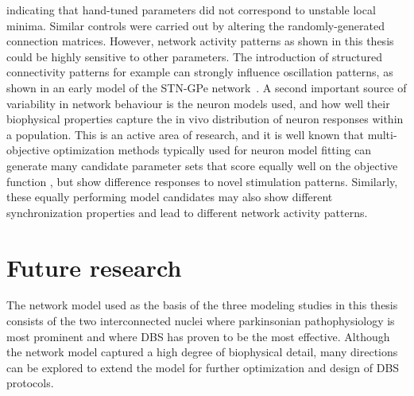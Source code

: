 indicating that hand-tuned parameters did not correspond to unstable local minima.
Similar controls were carried out by altering the randomly-generated connection matrices.
%
%
%
%
%
However, network activity patterns as shown in this thesis could be highly sensitive to other parameters.
The introduction of structured connectivity patterns for example can strongly influence
oscillation patterns, as shown in an early model of the STN-GPe network~\cite{terman_activity_2002}.
A second important source of variability in network behaviour is the neuron models used,
and how well their biophysical properties capture the in vivo distribution of neuron responses
within a population.
This is an active area of research, and it is well known that multi-objective optimization methods
typically used for neuron model fitting can generate many candidate parameter sets that score equally well
on the objective function \cite{van_geit_automated_2008}, but show difference responses
to novel stimulation patterns. Similarly, these equally performing model candidates may also show
different synchronization properties and lead to different network activity patterns.
%
%
%
%

%
%
%
%
%

%
%
%
%
%
%
%
%
%
%

\section{Future research}
%
%


The network model used as the basis of the three modeling studies in this thesis
consists of the two interconnected nuclei where parkinsonian pathophysiology is
most prominent and where DBS has proven to be the most effective. Although
the network model captured a high degree of biophysical detail, many directions
can be explored to extend the model for further optimization and design of
DBS protocols. %

